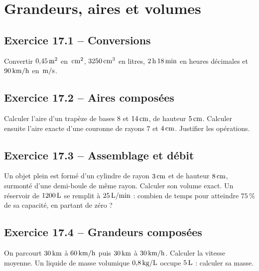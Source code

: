 \chapter{Grandeurs, aires et volumes}
\label{exercices:17}
\section*{Exercice 17.1 -- Conversions}
Convertir $0{,}45\,\mathrm{m^2}$ en $\,\mathrm{cm^2}$, $3250\,\mathrm{cm^3}$ en litres, $2\,\mathrm{h}\,18\,\mathrm{min}$ en heures décimales et $90\,\mathrm{km/h}$ en $\,\mathrm{m/s}$.

\section*{Exercice 17.2 -- Aires composées}
Calculer l'aire d'un trapèze de bases $8$ et $14\,\mathrm{cm}$, de hauteur $5\,\mathrm{cm}$. Calculer ensuite l'aire exacte d'une couronne de rayons $7$ et $4\,\mathrm{cm}$. Justifier les opérations.

\section*{Exercice 17.3 -- Assemblage et débit}
Un objet plein est formé d'un cylindre de rayon $3\,\mathrm{cm}$ et de hauteur $8\,\mathrm{cm}$, surmonté d'une demi-boule de même rayon. Calculer son volume exact. Un réservoir de $1200\,\mathrm{L}$ se remplit à $25\,\mathrm{L/min}$ : combien de temps pour atteindre $75\,\%$ de sa capacité, en partant de zéro ?

\section*{Exercice 17.4 -- Grandeurs composées}
On parcourt $30\,\mathrm{km}$ à $60\,\mathrm{km/h}$ puis $30\,\mathrm{km}$ à $30\,\mathrm{km/h}$. Calculer la vitesse moyenne. Un liquide de masse volumique $0{,}8\,\mathrm{kg/L}$ occupe $5\,\mathrm{L}$ : calculer sa masse.
